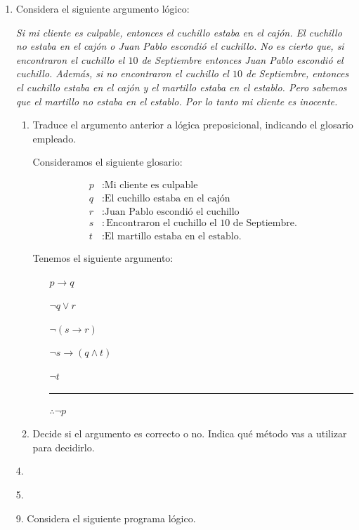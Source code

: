 \documentclass[11pt,letterpaper]{article}
\begin{document}
\begin{enumerate}
\item Considera el siguiente argumento lógico:
  
  {\it Si mi cliente es culpable, entonces el cuchillo estaba en el cajón. El
  cuchillo no estaba en el cajón o Juan Pablo escondió el cuchillo. No es
  cierto que, si encontraron el cuchillo el $10$ de Septiembre entonces
  Juan Pablo escondió el cuchillo. Además, si no encontraron el cuchillo el
  $10$ de Septiembre, entonces el cuchillo estaba en el cajón y el martillo
  estaba en el establo. Pero sabemos que el martillo no estaba en el
  establo. Por lo tanto mi cliente es inocente.}
  \begin{enumerate}
  \item Traduce el argumento anterior a lógica preposicional, indicando
    el glosario empleado.

    Consideramos el siguiente glosario:

    \begin{align*}
      p&:\text{Mi cliente es culpable}\\
      q&:\text{El cuchillo estaba en el cajón}\\
      r&:\text{Juan Pablo escondió el cuchillo}\\
      s&:\text{Encontraron el cuchillo el $10$ de Septiembre.}\\
      t&:\text{El martillo estaba en el establo.}
    \end{align*}

    Tenemos el siguiente argumento:
    \begin{itemize}
    \item[] $p\rightarrow q$
    \item[] $\neg q\lor r$
    \item[] $\neg(s\rightarrow r)$
    \item[] $\neg s\rightarrow (q\land t)$
    \item[] $\neg t$\\
      \rule{.3\textwidth}{0.2mm}
    \item[] $\therefore \neg p$
    \end{itemize}
  \item Decide si el argumento es correcto o no. Indica qué método
    vas a utilizar para decidirlo.
  \end{enumerate}

\item[4.]
\item[5.]
\item[9.] Considera el siguiente programa lógico.


\end{enumerate}
\end{document}
